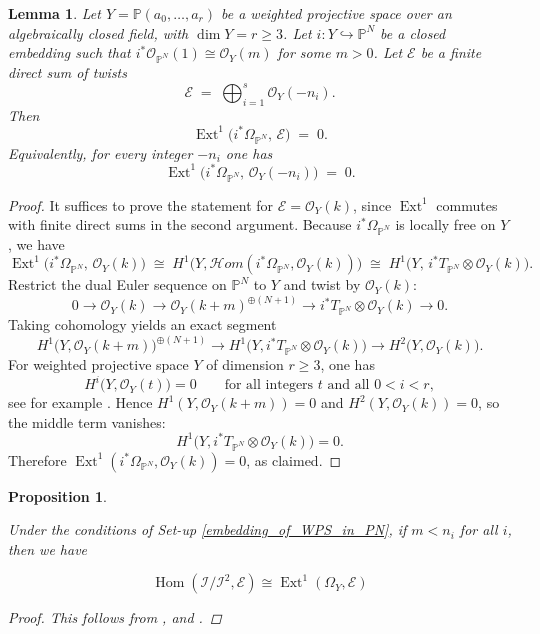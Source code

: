 \documentclass[11pt,twoside]{amsart}
\theoremstyle{plain}
\numberwithin{equation}{section}
\newtheorem{proposition}[theorem]{Proposition}
\newtheorem{lemma}[theorem]{Lemma}
\theoremstyle{definition}
\begin{document}
\begin{lemma}\label{lem:Ext1_pullback_Omega_vanish_WPS}
Let $Y=\mathbb P(a_0,\dots,a_r)$ be a weighted projective space over an algebraically closed field,
with $\dim Y=r\ge 3$. Let $i:Y\hookrightarrow \mathbb P^N$ be a closed embedding such that
$i^*\mathcal O_{\mathbb P^N}(1)\cong \mathcal O_Y(m)$ for some $m>0$.
Let $\mathcal E$ be a finite direct sum of twists
\[
\mathcal E \;=\;\bigoplus_{i=1}^s \mathcal O_Y(-n_i).
\]
Then
\[
\operatorname{Ext}^1\!\bigl(i^*\Omega_{\mathbb P^N},\,\mathcal E\bigr)\;=\;0.
\]
Equivalently, for every integer $-n_i$ one has
\[
\operatorname{Ext}^1\!\bigl(i^*\Omega_{\mathbb P^N},\,\mathcal O_Y(-n_i)\bigr)\;=\;0.
\]
\end{lemma}

\begin{proof}
It suffices to prove the statement for $\mathcal E=\mathcal O_Y(k)$, since $\operatorname{Ext}^1$ commutes with finite
direct sums in the second argument. Because $i^*\Omega_{\mathbb P^N}$ is locally free on $Y$, we have
\[
\operatorname{Ext}^1\!\bigl(i^*\Omega_{\mathbb P^N},\,\mathcal O_Y(k)\bigr)
\;\cong\;
H^1\!\bigl(Y,\mathcal H\!om(i^*\Omega_{\mathbb P^N},\mathcal O_Y(k))\bigr)
\;\cong\;
H^1\!\bigl(Y,\,i^*T_{\mathbb P^N}\otimes \mathcal O_Y(k)\bigr).
\]
Restrict the dual Euler sequence on $\mathbb P^N$ to $Y$ and twist by $\mathcal O_Y(k)$:
\[
0\longrightarrow \mathcal O_Y(k)
\longrightarrow \mathcal O_Y(k+m)^{\oplus (N+1)}
\longrightarrow i^*T_{\mathbb P^N}\otimes \mathcal O_Y(k)
\longrightarrow 0.
\]
Taking cohomology yields an exact segment
\[
H^1\!\bigl(Y,\mathcal O_Y(k+m)\bigr)^{\oplus (N+1)}
\longrightarrow
H^1\!\bigl(Y,i^*T_{\mathbb P^N}\otimes \mathcal O_Y(k)\bigr)
\longrightarrow
H^2\!\bigl(Y,\mathcal O_Y(k)\bigr).
\]
For weighted projective space $Y$ of dimension $r\ge 3$, one has
\[
H^i\!\bigl(Y,\mathcal O_Y(t)\bigr)=0\qquad\text{for all integers $t$ and all }0<i<r,
\]
see for example \cite[Theorem~3.2.4(iii)]{DolgachevWPS}.
Hence $H^1(Y,\mathcal O_Y(k+m))=0$ and $H^2(Y,\mathcal O_Y(k))=0$, so the middle term vanishes:
\[
H^1\!\bigl(Y,i^*T_{\mathbb P^N}\otimes \mathcal O_Y(k)\bigr)=0.
\]
Therefore $\operatorname{Ext}^1(i^*\Omega_{\mathbb P^N},\mathcal O_Y(k))=0$, as claimed.
\end{proof}

\begin{proposition}\label{embedded_ribbons_abstract_ribbons}

Under the conditions of Set-up \ref{embedding_of_WPS_in_PN}, if $m < n_i$ for all $i$, then we have 

\begin{equation*}
  \operatorname{Hom}(\mathcal{I}/\mathcal{I}^2, \mathcal{E}) \cong \operatorname{Ext}^1(\Omega_Y, \mathcal{E})  
\end{equation*}

\begin{proof}
    This follows from ,  and .
\end{proof}

    
\end{proposition}
\end{document}
